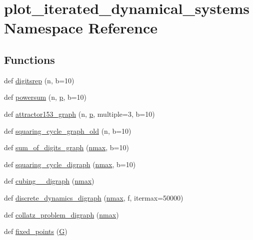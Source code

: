 \hypertarget{namespaceplot__iterated__dynamical__systems}{}\section{plot\+\_\+iterated\+\_\+dynamical\+\_\+systems Namespace Reference}
\label{namespaceplot__iterated__dynamical__systems}
\subsection*{Functions}
\begin{DoxyCompactItemize}
\item 
def \hyperlink{namespaceplot__iterated__dynamical__systems_a73a5c6f1366e2118cfedd584485834af}{digitsrep} (n, b=10)
\item 
def \hyperlink{namespaceplot__iterated__dynamical__systems_aab99329c758d98ec4e805eeaf2093e0a}{powersum} (n, \hyperlink{namespaceplot__iterated__dynamical__systems_a36b82f4bf0fd518f7e0230a5b05b75ec}{p}, b=10)
\item 
def \hyperlink{namespaceplot__iterated__dynamical__systems_ae6f26c3df4d2ea1f2ba8c6a5666d7184}{attractor153\+\_\+graph} (n, \hyperlink{namespaceplot__iterated__dynamical__systems_a36b82f4bf0fd518f7e0230a5b05b75ec}{p}, multiple=3, b=10)
\item 
def \hyperlink{namespaceplot__iterated__dynamical__systems_a5b4353dd5b98c950e009f3d3c2abb0fb}{squaring\+\_\+cycle\+\_\+graph\+\_\+old} (n, b=10)
\item 
def \hyperlink{namespaceplot__iterated__dynamical__systems_a01953a2853afa0c505276d1d77a351f3}{sum\+\_\+of\+\_\+digits\+\_\+graph} (\hyperlink{namespaceplot__iterated__dynamical__systems_a75b0c2725adb50615bbff6b196ac1b71}{nmax}, b=10)
\item 
def \hyperlink{namespaceplot__iterated__dynamical__systems_abbc15c8d89aad798b3972090d7e8b35a}{squaring\+\_\+cycle\+\_\+digraph} (\hyperlink{namespaceplot__iterated__dynamical__systems_a75b0c2725adb50615bbff6b196ac1b71}{nmax}, b=10)
\item 
def \hyperlink{namespaceplot__iterated__dynamical__systems_a6b07bbba09840ed7bc029ef2b09965df}{cubing\+\_\+\_\+digraph} (\hyperlink{namespaceplot__iterated__dynamical__systems_a75b0c2725adb50615bbff6b196ac1b71}{nmax})
\item 
def \hyperlink{namespaceplot__iterated__dynamical__systems_a6ccc9a51951a70a928a6c45ec7a7ec03}{discrete\+\_\+dynamics\+\_\+digraph} (\hyperlink{namespaceplot__iterated__dynamical__systems_a75b0c2725adb50615bbff6b196ac1b71}{nmax}, f, itermax=50000)
\item 
def \hyperlink{namespaceplot__iterated__dynamical__systems_a138daf15680c2aeca61a45fb22d951f2}{collatz\+\_\+problem\+\_\+digraph} (\hyperlink{namespaceplot__iterated__dynamical__systems_a75b0c2725adb50615bbff6b196ac1b71}{nmax})
\item 
def \hyperlink{namespaceplot__iterated__dynamical__systems_a7965bb0b026d41ae0096a921f7d8cd17}{fixed\+\_\+points} (\hyperlink{namespaceplot__iterated__dynamical__systems_a3d0d344a2ee2a00fea2ef1ae6f21df3d}{G})
\end{DoxyCompactItemize}
